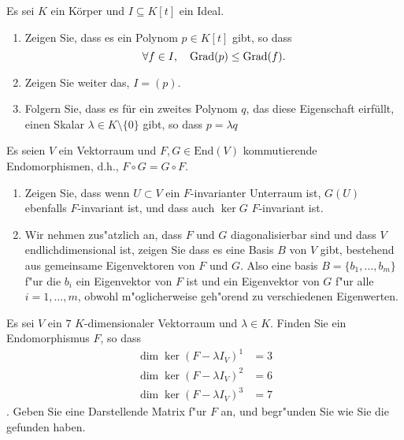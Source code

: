 \documentclass[a4,11pt]{article}
\begin{document}
\vspace*{-17mm}
{
\kopf
}


\begin{aufgabe}[4 Punkte]
Es sei $K$ ein K\"orper und $I \subseteq K[t]$ ein Ideal.

\begin{enumerate}
\item Zeigen Sie, dass es ein Polynom $p \in K[t]$ gibt, so dass
\[
\forall f \in I, \quad \operatorname{Grad} (p) \leq \operatorname{Grad} (f).
\]
\item Zeigen Sie weiter das, $I = (p)$.
\item Folgern Sie, dass es f\"ur ein zweites Polynom $q$, das diese Eigenschaft eirf\"ullt, einen Skalar $\lambda \in K \setminus \{0\}$ gibt, so dass $p = \lambda q$
\end{enumerate}

\end{aufgabe}

\begin{aufgabe}[4 Punkte]

Es seien $V$ ein Vektorraum und $F, G \in \text{End}(V)$ kommutierende Endomorphismen, d.h., $F \circ G = G \circ F$.
\begin{enumerate}
\item
Zeigen Sie, dass wenn $U \subset V$ ein $F$-invarianter Unterraum ist, $G(U)$ ebenfalls $F$-invariant ist, und dass auch $\ker G$  $F$-invariant ist.

\item Wir nehmen zus"atzlich an, dass  $F$ und $G$ diagonalisierbar sind und dass $V$ endlichdimensional ist, zeigen Sie dass es eine Basis $B$ von $V$ gibt, bestehend aus gemeinsame Eigenvektoren von $F$ und $G$. Also eine basis $B = \{ b_1, \dots , b_m\}$ f"ur die $b_i$ ein Eigenvektor von $F$ ist und ein Eigenvektor von $G$ f"ur alle $i = 1, \dots , m$, obwohl m"oglicherweise geh"orend zu verschiedenen Eigenwerten.
\end{enumerate}
\end{aufgabe}


\begin{aufgabe}[4 Punkte]
Es sei $V$ ein $7$ $K$-dimensionaler Vektorraum und $\lambda \in K$. Finden Sie ein Endomorphismus $F$, so dass
\begin{align*}
\dim \ker (F -\lambda I_V)^1 &= 3\\
\dim \ker (F -\lambda I_V)^2 &= 6 \\
\dim \ker (F -\lambda I_V)^3 &= 7
\end{align*}.
Geben Sie eine Darstellende Matrix f"ur $F$ an, und begr"unden Sie wie Sie die gefunden haben.
\end{aufgabe}
\end{document}
